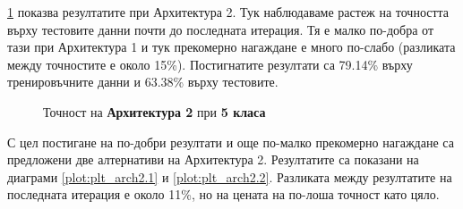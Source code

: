 \ref{plot:plt_arch2} показва резултатите при Архитектура 2. Тук наблюдаваме растеж на точността върху тестовите данни почти до последната итерация. Тя е малко по-добра от тази при Архитектура 1 и тук прекомерно нагаждане е много по-слабо (разликата между точностите е около 15\%). Постигнатите резултати са 79.14\% върху тренировъчните данни и 63.38\% върху тестовите.

\begin{figure}[H]
\centering
{}
\caption{Точност на \textbf{Архитектура 2} при \textbf{5 класа}}
\label{plot:plt_arch2}
\end{figure}


С цел постигане на по-добри резултати и още по-малко прекомерно нагаждане са предложени две алтернативи на Архитектура 2. Резултатите са показани на диаграми \ref{plot:plt_arch2.1} и \ref{plot:plt_arch2.2}. Разликата между резултатите на последната итерация е около 11\%, но на цената на по-лоша точност като цяло.

